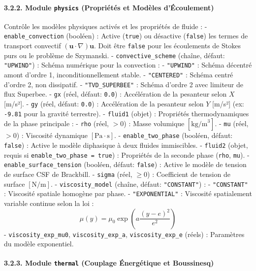\documentclass[
  french,
]{article}
\begin{document}
\paragraph{\texorpdfstring{3.2.2. Module \texttt{physics} (Propriétés et
Modèles
d'Écoulement)}{3.2.2. Module physics (Propriétés et Modèles d'Écoulement)}}\label{module-physics-propriuxe9tuxe9s-et-moduxe8les-duxe9coulement}

Contrôle les modèles physiques activés et les propriétés de fluide : -
\texttt{enable\_convection} (booléen) : Active (\texttt{true}) ou
désactive (\texttt{false}) les termes de transport convectif
\((\mathbf{u}\cdot\nabla)\mathbf{u}\). Doit être \texttt{false} pour les
écoulements de Stokes purs ou le problème de Szymanski. -
\texttt{convective\_scheme} (chaîne, défaut: \texttt{"UPWIND"}) : Schéma
numérique pour la convection : - \texttt{"UPWIND"} : Schéma décentré
amont d'ordre 1, inconditionnellement stable. - \texttt{"CENTERED"} :
Schéma centré d'ordre 2, non dissipatif. - \texttt{"TVD\_SUPERBEE"} :
Schéma d'ordre 2 avec limiteur de flux Superbee. - \texttt{gx} (réel,
défaut: \texttt{0.0}) : Accélération de la pesanteur selon \(X\)
{[}m/s²{]}. - \texttt{gy} (réel, défaut: \texttt{0.0}) : Accélération de
la pesanteur selon \(Y\) {[}m/s²{]} (ex: \texttt{-9.81} pour la gravité
terrestre). - \texttt{fluid1} (objet) : Propriétés thermodynamiques de
la phase principale : - \texttt{rho} (réel, \(>0\)) : Masse volumique
\([\text{kg/m}^3]\). - \texttt{mu} (réel, \(>0\)) : Viscosité dynamique
\([\text{Pa}\cdot\text{s}]\). - \texttt{enable\_two\_phase} (booléen,
défaut: \texttt{false}) : Active le modèle diphasique à deux fluides
immiscibles. - \texttt{fluid2} (objet, requis si
\texttt{enable\_two\_phase\ =\ true}) : Propriétés de la seconde phase
(\texttt{rho}, \texttt{mu}). - \texttt{enable\_surface\_tension}
(booléen, défaut: \texttt{false}) : Active le modèle de tension de
surface CSF de Brackbill. - \texttt{sigma} (réel, \(\ge 0\)) :
Coefficient de tension de surface \([\text{N/m}]\). -
\texttt{viscosity\_model} (chaîne, défaut: \texttt{"CONSTANT"}) : -
\texttt{"CONSTANT"} : Viscosité spatiale homogène par phase. -
\texttt{"EXPONENTIAL"} : Viscosité spatialement variable continue selon
la loi : \[\mu(y) = \mu_0 \exp\left( a \frac{(y-e)^2}{e^2} \right)\] -
\texttt{viscosity\_exp\_mu0}, \texttt{viscosity\_exp\_a},
\texttt{viscosity\_exp\_e} (réels) : Paramètres du modèle exponentiel.

\paragraph{\texorpdfstring{3.2.3. Module \texttt{thermal} (Couplage
Énergétique et
Boussinesq)}{3.2.3. Module thermal (Couplage Énergétique et Boussinesq)}}\label{module-thermal-couplage-uxe9nerguxe9tique-et-boussinesq}
\end{document}
